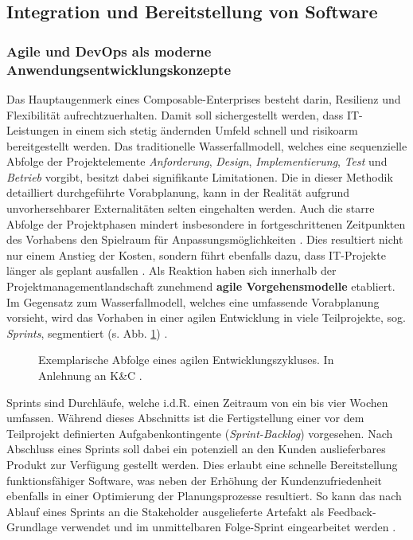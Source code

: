 \subsection{Integration und Bereitstellung von Software}
\subsubsection{Agile und DevOps als moderne Anwendungsentwicklungskonzepte}
Das Hauptaugenmerk eines Composable-Enterprises besteht darin, Resilienz und \\Flexibilität aufrechtzuerhalten. Damit soll sichergestellt werden, dass IT-Leistungen in einem sich stetig ändernden Umfeld schnell und risikoarm bereitgestellt werden. Das traditionelle Wasserfallmodell, welches eine sequenzielle Abfolge der Projektelemente \textit{Anforderung}, \textit{Design}, \textit{Implementierung}, \textit{Test} und \textit{Betrieb} vorgibt, besitzt dabei signifikante Limitationen. Die in dieser Methodik detailliert durchgeführte Vorabplanung, kann in der Realität aufgrund unvorhersehbarer Externalitäten selten eingehalten werden. Auch die starre Abfolge der Projektphasen mindert insbesondere in fortgeschrittenen Zeitpunkten des Vorhabens den Spielraum für Anpassungsmöglichkeiten \cite[5]{Vivenzio.2013}. Dies resultiert nicht nur einem Anstieg der Kosten, sondern führt ebenfalls dazu, dass IT-Projekte länger als geplant ausfallen \cite[41]{Vieweg.2015}. Als Reaktion haben sich innerhalb der Projektmanagementlandschaft zunehmend \textbf{agile Vorgehensmodelle} etabliert.
Im Gegensatz zum Wasserfallmodell, welches eine umfassende Vorabplanung vorsieht, wird das Vorhaben in einer agilen Entwicklung in viele Teilprojekte, sog. \textit{Sprints}, segmentiert (s. Abb. \ref*{fig:Agile_Cycle}) \cite[87]{Goll.2015}. 
\begin{center}
	\begin{figure}[H]
		\centering
		\caption[Exemplarische Abfolge eines agilen Entwicklungszykluses]{Exemplarische Abfolge eines agilen Entwicklungszykluses. In Anlehnung an K\&C \cite{K&C.2021}.}
		\label{fig:Agile_Cycle}
	\end{figure}	
\end{center}
\vspace*{-15mm}
Sprints sind Durchläufe, welche i.d.R. einen Zeitraum von ein bis vier Wochen umfassen. Während dieses Abschnitts ist die Fertigstellung einer vor dem Teilprojekt definierten Aufgabenkontingente (\textit{Sprint-Backlog}) vorgesehen. Nach Abschluss eines Sprints soll dabei ein potenziell an den Kunden auslieferbares Produkt zur Verfügung gestellt werden. Dies erlaubt eine schnelle Bereitstellung funktionsfähiger Software, was neben der Erhöhung der Kundenzufriedenheit ebenfalls in einer Optimierung der Planungsprozesse resultiert. So kann das nach Ablauf eines Sprints an die Stakeholder ausgelieferte Artefakt als Feedback-Grundlage verwendet und im unmittelbaren Folge-Sprint eingearbeitet werden \cite[39]{K&C.2021}. 
